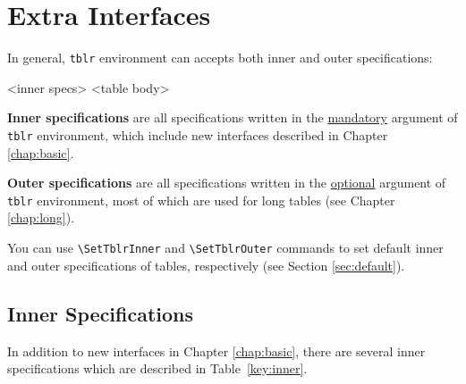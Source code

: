 \documentclass[oneside]{book}
\begin{document}
\chapter{Extra Interfaces}
\label{chap:extra}

In general, \verb!tblr! environment can accepts both inner and outer specifications:

\begin{codehigh}
\begin{tblr}{<inner specs>}
  <table body>
\end{tblr}
\end{codehigh}

\textbf{Inner specifications} are all specifications written in the \underline{mandatory} argument
of \verb!tblr! environment, which include new interfaces described in Chapter \ref{chap:basic}.

\textbf{Outer specifications} are all specifications written in the \underline{optional} argument
of \verb!tblr! environment, most of which are used for long tables (see Chapter \ref{chap:long}).

You can use \verb!\SetTblrInner! and \verb!\SetTblrOuter! commands
to set default inner and outer specifications of tables, respectively (see Section \ref{sec:default}).

\section{Inner Specifications}

In addition to new interfaces in Chapter \ref{chap:basic},
there are several inner specifications which are described in Table~\ref{key:inner}.
\end{document}
